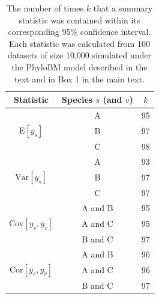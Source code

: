 \documentclass[oneside]{article}
\begin{document}
\begin{table}[h]
  \caption{The number of times $k$ that a summary statistic was contained within its corresponding 95\% confidence interval.
    Each statistic was calculated from 100 datasets of size 10,000 simulated under the PhyloBM model described in the text and in Box 1 in the main text.}
  \label{suptab:bmsimcis}
  \centering
  \begin{tabular}{ ccc }
    \hline
    Statistic & Species $s$ (and $v$)& $k$\\
    \hline  
    \rowcolor{gray!10}                      & A & 95\\
    \rowcolor{gray!10} $\text{E}[y_s]$      & B & 97\\
    \rowcolor{gray!10}                      & C & 98\\
                                            & A & 93\\
                       $\text{Var}[y_s]$    & B & 97\\
                                            & C & 97\\
    \rowcolor{gray!10}                      & A and B & 95\\
    \rowcolor{gray!10}$\text{Cov}[y_s,y_v]$ & A and C & 95\\
    \rowcolor{gray!10}                      & B and C & 97\\
                                            & A and B & 96\\
                      $\text{Cor}[y_s,y_v]$ & A and C & 96\\
                                            & B and C & 97\\
    \hline
  \end{tabular}
\end{table}


\end{document}

